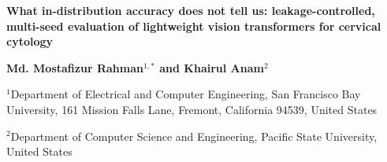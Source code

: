 \documentclass[12pt,letterpaper]{article}
\begin{document}
\linenumbers

\begin{center}
{\fontsize{16}{19}\selectfont\bfseries What in-distribution accuracy does not tell us: leakage-controlled, multi-seed evaluation of lightweight vision transformers for cervical cytology\par}
\vspace{18pt}
{\fontsize{12}{14}\selectfont\bfseries Md. Mostafizur Rahman$^{1,*}$ and Khairul Anam$^{2}$\par}
\vspace{4pt}
{\fontsize{10}{12}\selectfont $^1$Department of Electrical and Computer Engineering, San Francisco Bay University, 161 Mission Falls Lane, Fremont, California 94539, United States\par}
{\fontsize{10}{12}\selectfont $^2$Department of Computer Science and Engineering, Pacific State University, United States\par}
\end{center}
\end{document}
